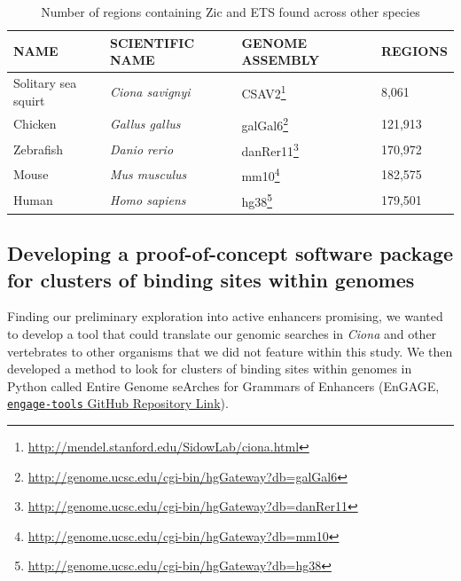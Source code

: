 \begin{small}
    \begin{table}[ht]
        \centering
        \caption{Number of regions containing Zic and ETS found across other species} 
        \begin{tabular}{|l|l|l|l|}
            \hline
            \textbf{NAME} & \textbf{SCIENTIFIC NAME} & \textbf{GENOME ASSEMBLY} & \textbf{REGIONS} \\ \hline 
            

            Solitary sea squirt & \textit{Ciona savignyi} & CSAV2\footnote{\href{http://mendel.stanford.edu/SidowLab/ciona.html}{http://mendel.stanford.edu/SidowLab/ciona.html}} \cite{hill2008} & 8,061\\
            Chicken & \textit{Gallus gallus} & galGal6\footnote{\href{http://genome.ucsc.edu/cgi-bin/hgGateway?db=galGal6}{http://genome.ucsc.edu/cgi-bin/hgGateway?db=galGal6}} & 121,913\\
            Zebrafish & \textit{Danio rerio} & danRer11\footnote{\href{http://genome.ucsc.edu/cgi-bin/hgGateway?db=danRer11}{http://genome.ucsc.edu/cgi-bin/hgGateway?db=danRer11}} & 170,972\\
            Mouse & \textit{Mus musculus} & mm10\footnote{\href{http://genome.ucsc.edu/cgi-bin/hgGateway?db=mm10}{http://genome.ucsc.edu/cgi-bin/hgGateway?db=mm10}} & 182,575\\
            Human & \textit{Homo sapiens} & hg38\footnote{\href{http://genome.ucsc.edu/cgi-bin/hgGateway?db=hg38}{http://genome.ucsc.edu/cgi-bin/hgGateway?db=hg38}} & 179,501\\
            \hline
        \end{tabular}
        \label{tab:genome search vertebrate numbers}
    \end{table}
\end{small}

\subsection{Developing a proof-of-concept software package for clusters of binding sites within genomes}

Finding our preliminary exploration into active enhancers promising, we wanted to develop a tool that could translate our genomic searches in \textit{Ciona} and other vertebrates to other organisms that we did not feature within this study. We then developed a method to look for clusters of binding sites within genomes in Python called Entire Genome seArches for Grammars of Enhancers (EnGAGE, \href{https://github.com/mragsac/engage-tools}{\texttt{engage-tools} GitHub Repository Link}). 

